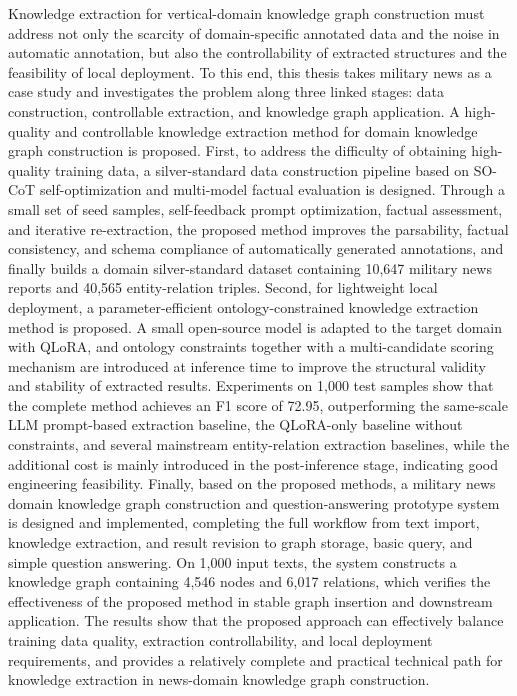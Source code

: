 \begin{abstractEn}
  Knowledge extraction for vertical-domain knowledge graph construction must address not only the scarcity of domain-specific annotated data and the noise in automatic annotation, but also the controllability of extracted structures and the feasibility of local deployment. To this end, this thesis takes military news as a case study and investigates the problem along three linked stages: data construction, controllable extraction, and knowledge graph application. A high-quality and controllable knowledge extraction method for domain knowledge graph construction is proposed. First, to address the difficulty of obtaining high-quality training data, a silver-standard data construction pipeline based on SO-CoT self-optimization and multi-model factual evaluation is designed. Through a small set of seed samples, self-feedback prompt optimization, factual assessment, and iterative re-extraction, the proposed method improves the parsability, factual consistency, and schema compliance of automatically generated annotations, and finally builds a domain silver-standard dataset containing 10,647 military news reports and 40,565 entity-relation triples. Second, for lightweight local deployment, a parameter-efficient ontology-constrained knowledge extraction method is proposed. A small open-source model is adapted to the target domain with QLoRA, and ontology constraints together with a multi-candidate scoring mechanism are introduced at inference time to improve the structural validity and stability of extracted results. Experiments on 1,000 test samples show that the complete method achieves an F1 score of 72.95, outperforming the same-scale LLM prompt-based extraction baseline, the QLoRA-only baseline without constraints, and several mainstream entity-relation extraction baselines, while the additional cost is mainly introduced in the post-inference stage, indicating good engineering feasibility. Finally, based on the proposed methods, a military news domain knowledge graph construction and question-answering prototype system is designed and implemented, completing the full workflow from text import, knowledge extraction, and result revision to graph storage, basic query, and simple question answering. On 1,000 input texts, the system constructs a knowledge graph containing 4,546 nodes and 6,017 relations, which verifies the effectiveness of the proposed method in stable graph insertion and downstream application. The results show that the proposed approach can effectively balance training data quality, extraction controllability, and local deployment requirements, and provides a relatively complete and practical technical path for knowledge extraction in news-domain knowledge graph construction.
\end{abstractEn}
